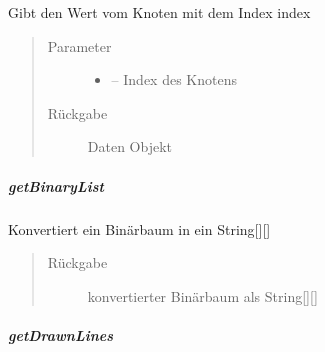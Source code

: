 \documentclass[letterpaper,10pt,ngerman]{sphinxmanual}
\begin{document}
\begin{fulllineitems}
\label{\detokenize{com/linuxluigi/edu/list/SinglyLinkedList:com.linuxluigi.edu.list.SinglyLinkedList.get(int)}}
Gibt den Wert vom Knoten mit dem Index index
\begin{quote}\begin{description}
\item[{Parameter}] \leavevmode\begin{itemize}
\item {} 
 -- Index des Knotens

\end{itemize}

\item[{Rückgabe}] \leavevmode
Daten Objekt

\end{description}\end{quote}

\end{fulllineitems}



\subparagraph{getBinaryList}
\label{\detokenize{com/linuxluigi/edu/list/SinglyLinkedList:getbinarylist}}

\begin{fulllineitems}
\label{\detokenize{com/linuxluigi/edu/list/SinglyLinkedList:com.linuxluigi.edu.list.SinglyLinkedList.getBinaryList()}}
Konvertiert ein Binärbaum in ein String{[}{]}{[}{]}
\begin{quote}\begin{description}
\item[{Rückgabe}] \leavevmode
konvertierter Binärbaum als String{[}{]}{[}{]}

\end{description}\end{quote}

\end{fulllineitems}



\subparagraph{getDrawnLines}
\label{\detokenize{com/linuxluigi/edu/list/SinglyLinkedList:getdrawnlines}}
\end{document}
